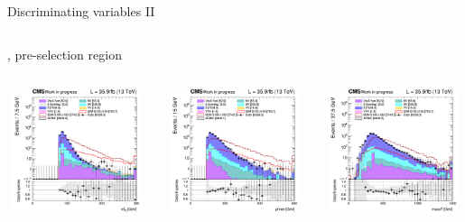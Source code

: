 \documentclass[8pt]{beamer}
\begin{document}
\begin{frame}{Discriminating variables II}
\begin{columns}
\begin{column}{1.09\textwidth}
\begin{block}{, pre-selection region}\end{block} \vspace{5pt}
\end{column}
\end{columns} \vspace{-5pt}
\begin{columns}
		\begin{column}{0.33\textwidth}
			\begin{center}
     			\includegraphics[width=1.0\textwidth, height=105pt]{figs/2016/SmearSR-ttDM-scalar100/log_cratio_topCR_ll_mt2ll.png}
    		\end{center}		
		\end{column} 
		\begin{column}{0.33\textwidth}
			\begin{center}
     			\includegraphics[width=1.0\textwidth, height=105pt]{figs/2016/SmearSR-ttDM-scalar100/log_cratio_topCR_ll_METcorrected_pt.png}
    		\end{center}		
		\end{column} 
		\begin{column}{0.33\textwidth}
			\begin{center}
     			\includegraphics[width=1.0\textwidth, height=105pt]{figs/2016/SmearSR-ttDM-scalar100/log_cratio_topCR_ll_massT.png}

\end{center}
\end{column}
\end{columns}
\end{frame}
\end{document}
